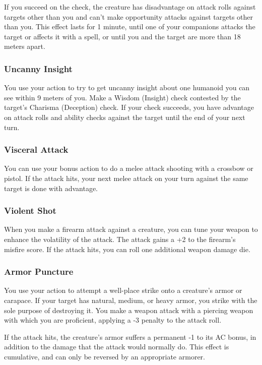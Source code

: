 If you succeed on the check, the creature has disadvantage on attack rolls against targets other than you and can't make opportunity attacks against targets other than you.
This effect lasts for 1 minute, until one of your companions attacks the target or affects it with a spell, or until you and the target are more than 18 meters apart.

\subsubsection{Uncanny Insight} \label{tec::uncannyinsight}
You use your action to try to get uncanny insight about one humanoid you can see within 9 meters of you.
Make a Wisdom (Insight) check contested by the target's Charisma (Deception) check.
If your check succeeds, you have advantage on attack rolls and ability checks against the target until the end of your next turn.

\subsubsection{Visceral Attack} \label{tec::visceralattack}
You can use your bonus action to do a melee attack shooting with a crossbow or pistol.
If the attack hits, your next melee attack on your turn against the same target is done with advantage.

\subsubsection{Violent Shot} \label{tec::violentshot}
When you make a firearm attack against a creature, you can tune your weapon to enhance the volatility of the attack.
The attack gains a +2 to the firearm's misfire score.
If the attack hits, you can roll one additional weapon damage die.

\subsubsection{Armor Puncture} \label{tec::armorpuncture}
You use your action to attempt a well-place strike onto a creature's armor or carapace.
If your target has natural, medium, or heavy armor, you strike with the sole purpose of destroying it.
You make a weapon attack with a piercing weapon with which you are proficient, applying a -3 penalty to the attack roll.

If the attack hits, the creature's armor suffers a permanent -1 to its AC bonus, in addition to the damage that the attack would normally do.
This effect is cumulative, and can only be reversed by an appropriate armorer.

